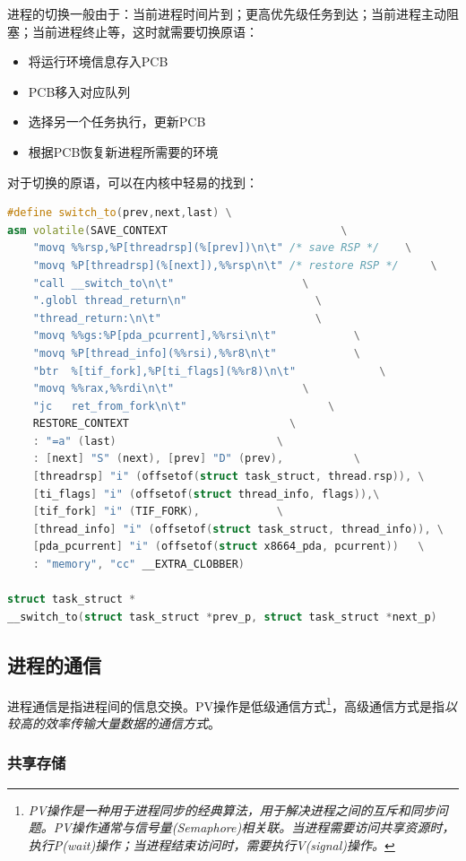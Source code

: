     进程的切换一般由于：当前进程时间片到；更高优先级任务到达；当前进程主动阻塞；当前进程终止等，这时就需要切换原语：

\begin{itemize}
    \item [1)] 将运行环境信息存入PCB
    \item [2)] PCB移入对应队列
    \item [3)] 选择另一个任务执行，更新PCB
    \item [4)] 根据PCB恢复新进程所需要的环境
\end{itemize}

    对于切换的原语，可以在内核中轻易的找到：

\begin{lstlisting}[language=C++]
#define switch_to(prev,next,last) \
asm volatile(SAVE_CONTEXT						    \
    "movq %%rsp,%P[threadrsp](%[prev])\n\t" /* save RSP */	  \
    "movq %P[threadrsp](%[next]),%%rsp\n\t" /* restore RSP */	  \
    "call __switch_to\n\t"					  \
    ".globl thread_return\n"					\
    "thread_return:\n\t"					    \
    "movq %%gs:%P[pda_pcurrent],%%rsi\n\t"			  \
    "movq %P[thread_info](%%rsi),%%r8\n\t"			  \
    "btr  %[tif_fork],%P[ti_flags](%%r8)\n\t"			  \
    "movq %%rax,%%rdi\n\t" 					  \
    "jc   ret_from_fork\n\t"					  \
    RESTORE_CONTEXT						    \
    : "=a" (last)					  	  \
    : [next] "S" (next), [prev] "D" (prev),			  \
    [threadrsp] "i" (offsetof(struct task_struct, thread.rsp)), \
    [ti_flags] "i" (offsetof(struct thread_info, flags)),\
    [tif_fork] "i" (TIF_FORK),			  \
    [thread_info] "i" (offsetof(struct task_struct, thread_info)), \
    [pda_pcurrent] "i" (offsetof(struct x8664_pda, pcurrent))   \
    : "memory", "cc" __EXTRA_CLOBBER)

struct task_struct *
__switch_to(struct task_struct *prev_p, struct task_struct *next_p)
\end{lstlisting}

\subsection{进程的通信}

    进程通信是指进程间的信息交换。PV操作是低级通信方式\footnote[1]{\emph{PV操作是一种用于进程同步的经典算法，用于解决进程之间的互斥和同步问题。PV操作通常与信号量(Semaphore)相关联。当进程需要访问共享资源时，执行P(wait)操作；当进程结束访问时，需要执行V(signal)操作。}}，高级通信方式是指\emph{以较高的效率传输大量数据的通信方式}。

\subsubsection{共享存储}

